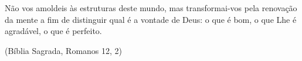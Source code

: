 \begin{epigrafe}
		Não vos amoldeis às estruturas deste mundo,  mas transformai-vos pela renovação da mente a fim de distinguir qual é a vontade de Deus: o que é bom, o que Lhe é agradável, o que é perfeito.

        (Bíblia Sagrada, Romanos 12, 2)	
\end{epigrafe}
